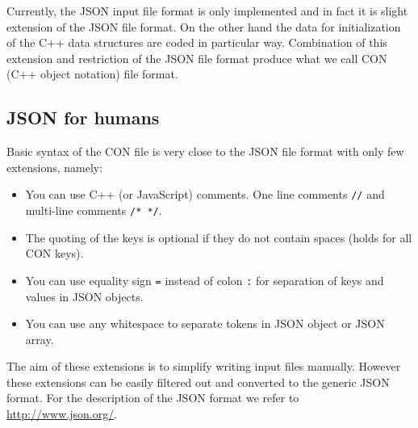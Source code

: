 Currently, the JSON input file format is only implemented and in fact it is slight extension of the JSON file format. On the other hand
the data for initialization of the C++ data structures are coded in particular way. Combination of this extension and restriction of the JSON file format produce 
what we call CON (C++ object notation) file format.


\subsection{JSON for humans}

Basic syntax of the CON file is very close to the JSON file format with only few extensions, namely:
\begin{itemize}
\item You can use C++ (or JavaScript) comments. One line comments \verb'//' and multi-line comments \verb'/* */'.
\item The quoting of the keys is optional if they do not contain spaces (holds for all CON keys).
\item You can use equality sign \verb'=' instead of colon \verb':' for separation of keys and values in JSON objects.
\item You can use any whitespace to separate tokens in JSON object or JSON array.
\end{itemize}
The aim of these extensions is to simplify writing input files manually. However these extensions can be easily filtered out and converted to 
the generic JSON format. For the description of the JSON format we refer to \url{http://www.json.org/}. 

